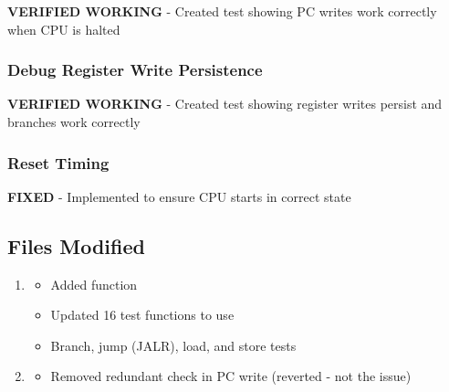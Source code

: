 \begin{record}

\ok{} \textbf{VERIFIED WORKING} - Created test showing PC writes work
correctly when CPU is halted

\end{record}

\subsubsection{Debug Register Write Persistence}\label{cr:fix:test-fix-summary:debug-register-write-persistence}

\begin{record}

\ok{} \textbf{VERIFIED WORKING} - Created test showing register writes
persist and branches work correctly

\end{record}

\subsubsection{Reset Timing}\label{cr:fix:test-fix-summary:reset-timing}

\begin{record}

\ok{} \textbf{FIXED} - Implemented  to ensure
CPU starts in correct state

\end{record}

\subsection{Files Modified}\label{cr:fix:test-fix-summary:files-modified}

\begin{record}

\begin{enumerate}
\def\labelenumi{\arabic{enumi}.}
\item

  \begin{itemize}
  \tightlist
  \item
    Added  function
  \item
    Updated 16 test functions to use 
  \item
    Branch, jump (JALR), load, and store tests
  \end{itemize}
\item

  \begin{itemize}
  \tightlist
  \item
    Removed redundant  check in PC write (reverted -
    not the issue)
  \end{itemize}
\end{enumerate}

\end{record}

